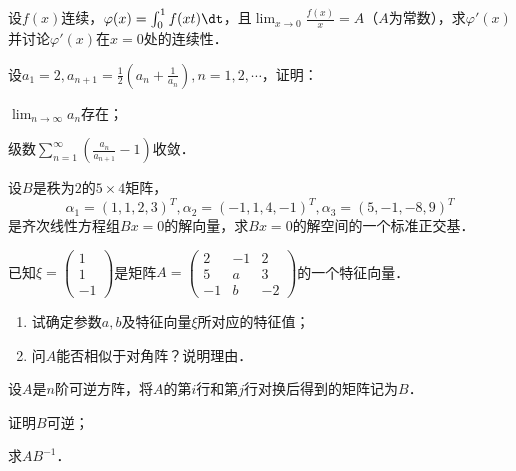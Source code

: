 \documentclass[plain,noanswer,medmath]{../../template/jnuexam}
\begin{document}

\begin{problem}
设$f(x)$连续，$\varphi (x) = \int_0^1f(xt) \dt$，且$\lim_{x \to 0} \frac{f(x)}{x} = A$（$A$为常数），求$\varphi'(x)$并讨论$\varphi'(x)$在$x = 0$处的连续性．
\end{problem}



\begin{problem}
设$a_1 = 2,a_{n + 1} = \frac{1}{2}\left(a_n + \frac{1}{a_n} \right),n = 1,2, \cdots$，证明：\par
\begin{enumerate*}
\item $\lim_{n \to \infty} a_n$存在；
\item 级数$\sum_{n = 1}^{\infty}\left(\frac{a_n}{a_{n + 1}} - 1 \right)$收敛．
\end{enumerate*}
\end{problem}




\begin{problem}
设$B$是秩为$2$的$5 \times 4$矩阵，
$$\alpha_1 = (1,1,2,3)^T,\alpha_2 = (- 1,1,4, - 1)^T,\alpha_3 = (5, - 1, - 8,9)^T$$
是齐次线性方程组$Bx = 0$的解向量，求$Bx = 0$的解空间的一个标准正交基．
\end{problem}


\begin{problem}
已知$\xi = \begin{pmatrix}
  1 \\
  1 \\
  -1
\end{pmatrix}$是矩阵$A = \begin{pmatrix}
   2 & -1 & 2 \\
   5 &  a & 3 \\
  -1 &  b & -2
\end{pmatrix}$的一个特征向量．
\begin{enumerate}
\item 试确定参数$a,b$及特征向量$\xi$所对应的特征值；
\item 问$A$能否相似于对角阵？说明理由．
\end{enumerate}
\end{problem}



\begin{problem}
设$A$是$n$阶可逆方阵，将$A$的第$i$行和第$j$行对换后得到的矩阵记为$B$．\par
\begin{enumerate*}
\item 证明$B$可逆；
\item 求$AB^{-1}$．
\end{enumerate*}
\end{problem}
\end{document}
